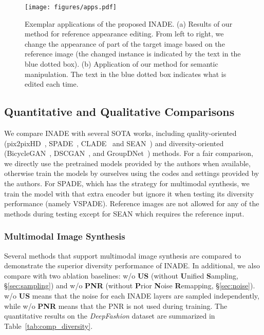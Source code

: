 \documentclass[final]{cvpr}
\begin{document}
\begin{figure}[tp]
  \centering
  \texttt{[image: figures/apps.pdf]}
  \caption{Exemplar applications of the proposed INADE. (a) Results of our method for reference appearance editing. From left to right, we change the appearance of part of the target image based on the reference image (the changed instance is indicated by the text in the blue dotted box). (b) Application of our method for semantic manipulation. The text in the blue dotted box indicates what is edited each time.}
  \label{fig:apps}
\end{figure}

\subsection{Quantitative and Qualitative Comparisons}
We compare INADE with several SOTA works, including quality-oriented (pix2pixHD~\cite{wang2018high}, SPADE~\cite{park2019semantic}, CLADE~\cite{tan2020rethinking,tan2020semantic} and SEAN~\cite{zhu2020sean})
and diversity-oriented (BicycleGAN~\cite{zhu2017toward}, DSCGAN~\cite{yang2018diversity}, and GroupDNet~\cite{zhu2020semantically}) methods. For a fair comparison, we directly use the pretrained models provided by the authors when available, otherwise train the models by ourselves using the codes and settings provided by the authors. For SPADE, which has the strategy for multimodal synthesis, we train the model with that extra encoder but ignore it when testing its diversity performance (namely VSPADE). Reference images are not allowed for any of the methods during testing except for SEAN which requires the reference input.

\subsubsection{Multimodal Image Synthesis}
Several methods that support multimodal image synthesis are compared to demonstrate the superior diversity performance of INADE. In additional, we also compare with two ablation baselines: w/o \textbf{US} (without \textbf{U}nified \textbf{S}ampling, \S\ref{sec:sampling}) and w/o \textbf{PNR} (without \textbf{P}rior \textbf{N}oise \textbf{R}emapping, \S\ref{sec:noise}). w/o \textbf{US} means that the noise for each INADE layers are sampled independently, while w/o \textbf{PNR} means that the PNR is not used during training.
The quantitative results on the \textit{DeepFashion} dataset are summarized in Table~\ref{tab:comp_diversity}.
\end{document}
